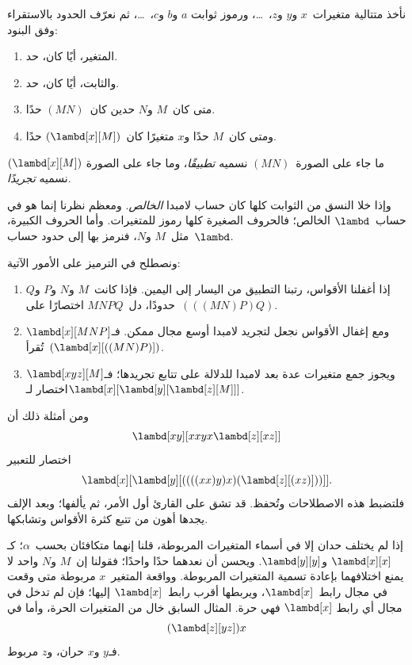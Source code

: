 \documentclass[../../../include/open-logic-section]{subfiles}
\begin{document}

نأخذ متتالية متغيرات~$x$ و$y$ و$z$،~\dots، ورموز ثوابت
$a$ و$b$ و$c$،~\dots، ثم نعرّف الحدود بالاستقراء وفق البنود:
\begin{enumerate}
\item المتغير، أيًا كان، حد.
\item والثابت، أيًا كان، حد.
\item متى كان~$M$ و$N$ حدين كان~$(MN)$ حدًا.
\item ومتى كان~$M$ حدًا و$x$ متغيرًا كان~$(\lambd[x][M])$ حدًا.
\end{enumerate}
ما جاء على الصورة~$(MN)$ نسميه \emph{تطبيقًا}، وما جاء على الصورة
$(\lambd[x][M])$ نسميه \emph{تجريدًا}.

وإذا خلا النسق من الثوابت كلها كان حساب لامبدا \emph{الخالص}.
ومعظم نظرنا إنما هو في حساب~$\lambd$ الخالص؛ فالحروف الصغيرة
كلها رموز للمتغيرات. وأما الحروف الكبيرة، مثل~$M$ و$N$،
فنرمز بها إلى حدود حساب~$\lambd$.

ونصطلح في الترميز على الأمور الآتية:

\begin{conv}
\begin{enumerate}
\item إذا أغفلنا الأقواس، رتبنا التطبيق من اليسار إلى اليمين.
  فإذا كانت~$M$ و$N$ و$P$ و$Q$ حدودًا، دل~$MNPQ$ اختصارًا
  على~$(((MN)P)Q)$.
\item ومع إغفال الأقواس نجعل لتجريد لامبدا أوسع مجال ممكن.
  فـ$\lambd[x][MNP]$ تُقرأ~$(\lambd[x][((MN)P)])$.
\item ويجوز جمع متغيرات عدة بعد لامبدا للدلالة على تتابع تجريدها؛
  فـ$\lambd[xyz][M]$ اختصار
  لـ$\lambd[x][\lambd[y][\lambd[z][M]]]$.
\end{enumerate}
\end{conv}

ومن أمثلة ذلك أن
\[
\lambd[xy][xxyx \lambd[z][xz]]
\]
اختصار للتعبير
\[
\lambd[x][\lambd[y][((((xx)y)x)(\lambd[z][(xz)]))]].
\]
فلتضبط هذه الاصطلاحات وتُحفظ. قد تشق على القارئ أول الأمر،
ثم يألفها؛ وبعد الإلف يجدها أهون من تتبع كثرة الأقواس وتشابكها.

إذا لم يختلف حدان إلا في أسماء المتغيرات المربوطة، قلنا إنهما
متكافئان بحسب~$\alpha$؛ كـ$\lambd[x][x]$ و$\lambd[y][y]$.
ويحسن أن نعدهما حدًا واحدًا؛ فقولنا إن~$M$ و$N$ واحد
لا يمنع اختلافهما بإعادة تسمية المتغيرات المربوطة.
وواقعة المتغير~$x$ مربوطة متى وقعت في مجال رابط~$\lambd[x]$،
ويربطها أقرب رابط~$\lambd[x]$ إليها؛ فإن لم تدخل في مجال أي رابط
$\lambd[x]$ فهي حرة. المثال السابق خال من المتغيرات الحرة،
وأما في
\[
(\lambd[z][yz])x
\]
فـ$y$ و$x$ حران، و$z$ مربوط.
\end{document}

